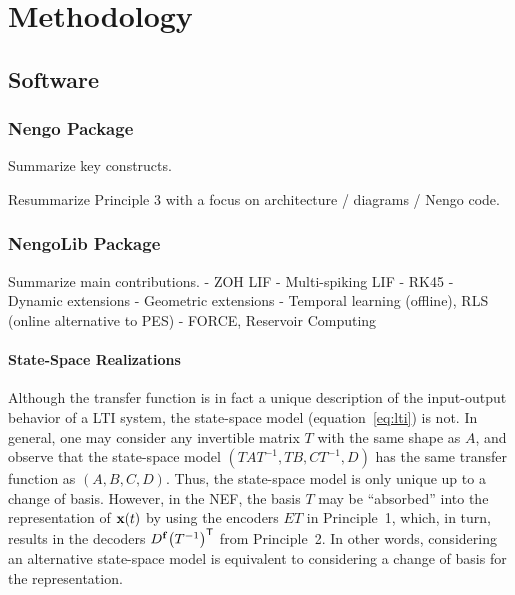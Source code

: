 \chapter{Methodology}
\label{chapt:methodology}


\section{Software}

\subsection{Nengo Package}

Summarize key constructs.

Resummarize Principle 3 with a focus on architecture / diagrams / Nengo code.

\subsection{NengoLib Package}
\label{sec:nengolib}

Summarize main contributions.
 - ZOH LIF
 - Multi-spiking LIF
 - RK45
 - Dynamic extensions
 - Geometric extensions
 - Temporal learning (offline), RLS (online alternative to PES)
 - FORCE, Reservoir Computing

\subsubsection{State-Space Realizations}

Although the transfer function is in fact a unique description of the input-output behavior of a LTI system, the state-space model (equation~\ref{eq:lti}) is not.
In general, one may consider any invertible matrix $T$ with the same shape as $A$, and observe that the state-space model $(TAT^{-1}\text{,}\, TB\text{,}\, CT^{-1}\text{,}\, D)$ has the same transfer function as $(A\text{,}\, B\text{,}\, C\text{,}\, D)$.
Thus, the state-space model is only unique up to a change of basis.
However, in the NEF, the basis $T$ may be ``absorbed'' into the representation of $\mathbf{x}(t)$ by using the encoders $ET$ in Principle~1, which, in turn, results in the decoders $D^{\mathbf{f}} {\left(T^{-1}\right)}^\mathsf{T}$ from Principle~2.
In other words, considering an alternative state-space model is equivalent to considering a change of basis for the representation.

